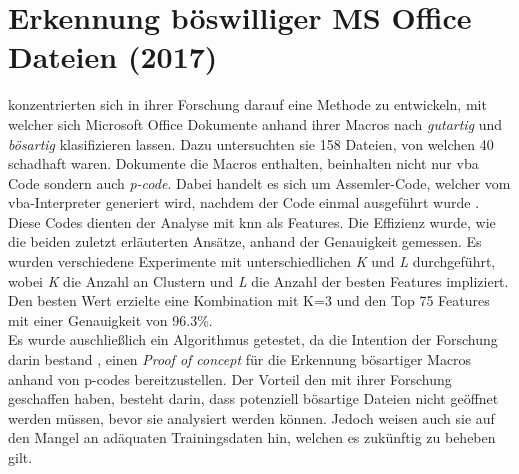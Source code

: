\documentclass[
    12pt, %
    DIV10,
    ngerman, %
    a4paper, %
    oneside, %
    titlepage, %
    parskip=half, %
    headings=normal, %
    listof=totoc, %
    bibliography=totoc, %
    index=totoc, %
    captions=tableheading, %
    final %
]{scrreprt}
\begin{document}
%
\section{Erkennung böswilliger MS Office Dateien (2017)}
\citeauthor{Bearden2018} konzentrierten sich in ihrer Forschung darauf eine Methode zu entwickeln, mit welcher sich Microsoft Office Dokumente anhand ihrer Macros nach \emph{gutartig} und \emph{bösartig} klasifizieren lassen. Dazu untersuchten sie 158 Dateien, von welchen 40 schadhaft waren. Dokumente die Macros enthalten, beinhalten nicht nur \ac{vba} Code sondern auch \emph{p-code}. Dabei handelt es sich um Assemler-Code, welcher vom \ac{vba}-Interpreter generiert wird, nachdem der Code einmal ausgeführt wurde \parencite{Bearden2018}. Diese Codes dienten der Analyse mit \ac{knn} als Features. Die Effizienz wurde, wie die beiden zuletzt erläuterten Ansätze, anhand der Genauigkeit gemessen. Es wurden verschiedene Experimente mit unterschiedlichen \emph{K} und \emph{L} durchgeführt, wobei \emph{K} die Anzahl an Clustern und \emph{L} die Anzahl der besten Features impliziert. Den besten Wert erzielte eine Kombination mit K=3 und den Top 75 Features mit einer Genauigkeit von 96.3\%.\\Es wurde auschließlich ein Algorithmus getestet, da die Intention der Forschung darin bestand , einen \emph{Proof of concept} für die Erkennung bösartiger Macros anhand von p-codes bereitzustellen. Der Vorteil den \citeauthor{Bearden2018} mit ihrer Forschung geschaffen haben, besteht darin, dass potenziell bösartige Dateien nicht geöffnet werden müssen, bevor sie analysiert werden können. Jedoch weisen auch sie auf den Mangel an adäquaten Trainingsdaten hin, welchen es zukünftig zu beheben gilt.
%
\end{document}
